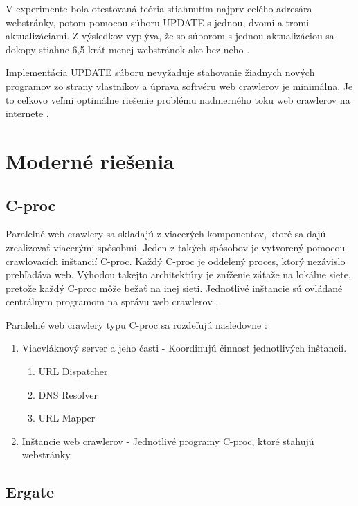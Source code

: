 \documentclass[10pt,twoside,slovak,a4paper]{article}
\begin{document}
V experimente bola otestovaná teória stiahnutím najprv celého adresára webstránky, potom pomocou súboru UPDATE s jednou, dvomi a tromi aktualizáciami. Z výsledkov vyplýva, že so súborom s jednou aktualizáciou sa dokopy stiahne 6,5-krát menej webstránok ako bez neho \cite{mishra2010smart}.

Implementácia UPDATE súboru nevyžaduje sťahovanie žiadnych nových programov zo strany vlastníkov a úprava softvéru web crawlerov je minimálna. Je to celkovo veľmi optimálne riešenie problému nadmerného toku web crawlerov na internete \cite{mishra2010smart}.

\section{Moderné riešenia}

\subsection{C-proc}

Paralelné web crawlery sa skladajú z viacerých komponentov, ktoré sa dajú zrealizovať viacerými spôsobmi. Jeden z takých spôsobov je vytvorený pomocou crawlovacích inštancií C-proc. Každý C-proc je oddelený proces, ktorý nezávislo prehľadáva web. Výhodou takejto architektúry je zníženie záťaže na lokálne siete, pretože každý C-proc môže bežať na inej sieti. Jednotlivé inštancie sú ovládané centrálnym programom na správu web crawlerov \cite{sharma2011novel}.

Paralelné web crawlery typu C-proc sa rozdeľujú nasledovne \cite{9645918, sharma2011novel}:

\begin{enumerate}
    \item Viacvláknový server a jeho časti - Koordinujú činnosť jednotlivých inštancií.
        \begin{enumerate}
            \item URL Dispatcher
            \item DNS Resolver
            \item URL Mapper
        \end{enumerate}
        \item Inštancie web crawlerov - Jednotlivé programy C-proc, ktoré sťahujú webstránky
\end{enumerate}

\subsection{Ergate}
\end{document}
